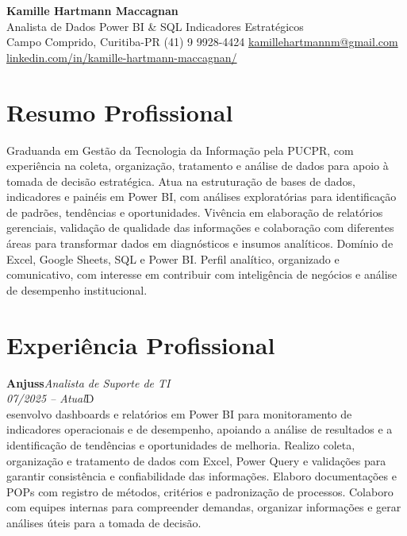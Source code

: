 \documentclass[11pt,a4paper]{article}
\newcommand{\cvrole}[4]{%
  \vspace{4pt}%
  {\bfseries\color{accentcolor}#1}\hfill{\itshape #2}\\[-2pt]%
  {\itshape #3}\hfill #4\\[6pt]%
}
\begin{document}
\begin{center}
  {\fontsize{20}{24}\selectfont\bfseries Kamille Hartmann Maccagnan}\\[8pt]
  {\large Analista de Dados \textbar{} Power BI \& SQL \textbar{} Indicadores Estratégicos}\\[10pt]
  Campo Comprido, Curitiba-PR \enspace\textbullet\enspace (41) 9 9928-4424 \enspace\textbullet\enspace
  \href{mailto:kamillehartmannm@gmail.com}{kamillehartmannm@gmail.com}\\[3pt]
  \href{https://linkedin.com/in/kamille-hartmann-maccagnan/}{linkedin.com/in/kamille-hartmann-maccagnan/}
\end{center}

\vspace{6pt}

\section{Resumo Profissional}

Graduanda em Gestão da Tecnologia da Informação pela PUCPR, com experiência na coleta, organização, tratamento e análise de dados para apoio à tomada de decisão estratégica. Atua na estruturação de bases de dados, indicadores e painéis em Power BI, com análises exploratórias para identificação de padrões, tendências e oportunidades. Vivência em elaboração de relatórios gerenciais, validação de qualidade das informações e colaboração com diferentes áreas para transformar dados em diagnósticos e insumos analíticos. Domínio de Excel, Google Sheets, SQL e Power BI. Perfil analítico, organizado e comunicativo, com interesse em contribuir com inteligência de negócios e análise de desempenho institucional.

\section{Experiência Profissional}

\cvrole{Anjuss}{Analista de Suporte de TI}{07/2025 -- Atual}

Desenvolvo dashboards e relatórios em Power BI para monitoramento de indicadores operacionais e de desempenho, apoiando a análise de resultados e a identificação de tendências e oportunidades de melhoria. Realizo coleta, organização e tratamento de dados com Excel, Power Query e validações para garantir consistência e confiabilidade das informações. Elaboro documentações e POPs com registro de métodos, critérios e padronização de processos. Colaboro com equipes internas para compreender demandas, organizar informações e gerar análises úteis para a tomada de decisão.
\end{document}
